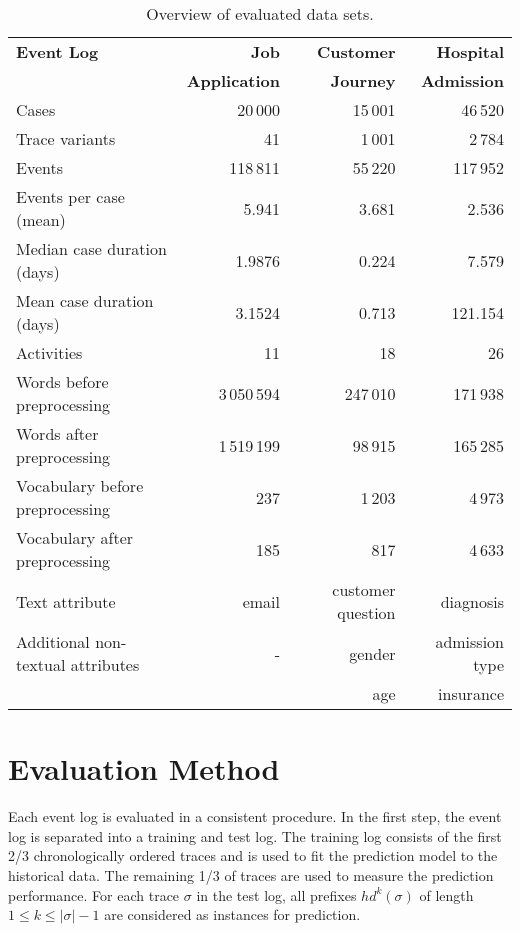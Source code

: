 \begin{table}[!htbp]
	\begin{tabularx}{\textwidth}{l r r r}
		\toprule
		\textbf{Event Log} & \textbf{Job} & \textbf{Customer} &\textbf{Hospital}  \\
		 & \textbf{Application} & \textbf{Journey} &\textbf{Admission}  \\
		\midrule
		Cases & 20\,000& 15\,001& 46\,520\\
		Trace variants &41 & 1\,001 &2\,784 \\
		Events & 118\,811 & 55\,220 & 117\,952\\
		Events per case (mean) & 5.941& 3.681& 2.536\\
		Median case duration (days) & 1.9876 & 0.224& 7.579\\
		Mean case duration (days)& 3.1524 &  0.713 & 121.154\\
		Activities & 11 & 18 & 26\\
		Words before preprocessing & 3\,050\,594 &247\,010 &  171\,938\\
		Words after preprocessing  &1\,519\,199 &98\,915 & 165\,285\\
		Vocabulary before preprocessing & 237 & 1\,203 & 4\,973 \\
		Vocabulary after preprocessing & 185 & 817 & 4\,633\\
		Text attribute & email& customer question & diagnosis\\
		Additional non-textual attributes & - & gender& admission type\\
		 &  & age& insurance\\
		\bottomrule
	\end{tabularx}
	\caption[Overview of evaluated data sets]{Overview of evaluated data sets.}
	\label{tab:logs}
\end{table}

\section{Evaluation Method}

Each event log is evaluated in a consistent procedure.
In the first step, the event log is separated into a training and test log. 
The training log consists of the first 2/3 chronologically ordered traces and is used to fit the prediction model to the historical data.
The remaining 1/3 of traces are used to measure the prediction performance.
For each trace $\sigma$ in the test log, all prefixes $hd^k(\sigma)$ of length $1 \leq k \leq |\sigma| - 1$ are considered as instances for prediction.

